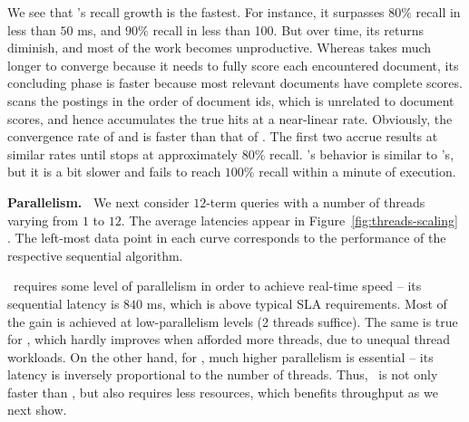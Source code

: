 {{We see that \alg's recall growth is the fastest. For instance, it surpasses $80\%$ recall in less than $50$ ms, 
and $90\%$ recall in less than 100. But over time, its returns  diminish, and most of the work becomes unproductive. Whereas
\pRA\/ takes much longer to converge because it needs to fully score each encountered document,  its concluding phase is faster because 
most relevant documents   have complete  scores. 
\pBMW\/ scans the postings in the order of document ids, which is unrelated to document scores, and hence accumulates the true hits 
at a near-linear rate. Obviously, the convergence rate of \pBMW\hi\/ and \pBMW\lo\/ is faster than that of \pBMW\ex. The first 
two accrue results at similar rates until \pBMW\lo\/ stops at approximately $80\%$ recall.
\pJASS's behavior  is similar to \alg's, but it is a bit slower and fails to reach $100\%$ recall within a minute of execution.

{\bf Parallelism.\ } 
We next consider  $12$-term queries with a number of threads varying from $1$ to $12$. 
The average latencies appear in Figure~\ref{fig:threads-scaling}
.  
The left-most data point in each curve corresponds to the performance of 
the respective sequential algorithm.

\alg\ requires some level of parallelism in order to achieve real-time speed -- its sequential latency is $840$ ms, which is  above typical SLA requirements. Most of the gain is achieved at low-parallelism levels (2 threads suffice). 
The same is true for \pJASS, which hardly improves when afforded more threads, due to unequal thread workloads.
On the other hand, for \pBMW, much higher parallelism is essential -- its latency is inversely proportional to the number of threads. Thus, \alg\ is not only faster 
than \pBMW, but also requires less resources, which benefits throughput as we next show.

}}
